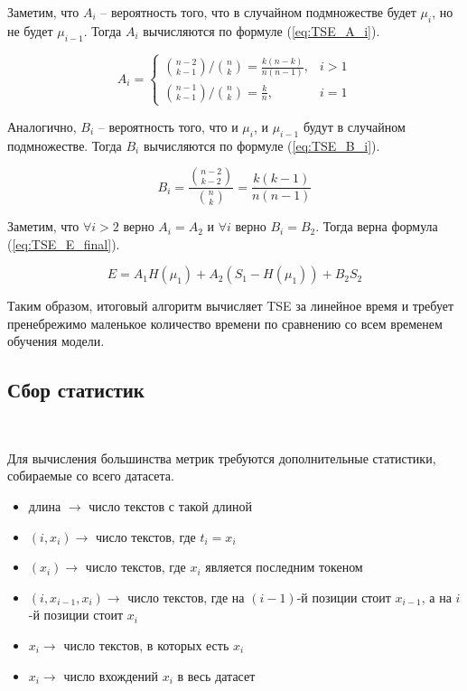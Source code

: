 \documentclass{spbau-diploma}
\begin{document}
Заметим, что $A_i$ -- вероятность того, что в случайном подмножестве будет $\mu_i$, но не будет $\mu_{i-1}$. Тогда $A_i$ вычисляются по формуле (\ref{eq:TSE_A_i}).

\begin{equation} \label{eq:TSE_A_i}
A_i = 
\begin{cases}
\binom{n-2}{k-1}/\binom{n}{k}=\frac{k(n-k)}{n(n-1)},& i > 1 \\
\binom{n-1}{k-1}/\binom{n}{k}=\frac k n,& i = 1
\end{cases}
\end{equation}

Аналогично, $B_i$ -- вероятность того, что и $\mu_i$, и $\mu_{i-1}$ будут в случайном подмножестве. Тогда $B_i$ вычисляются по формуле (\ref{eq:TSE_B_i}).

\begin{equation} \label{eq:TSE_B_i}
B_i = \frac{\binom{n-2}{k-2}}{\binom{n}{k}} = \frac{k(k-1)}{n(n-1)}
\end{equation}

Заметим, что $\forall i > 2$ верно $A_i = A_2$ и $\forall i$ верно $B_i = B_2$. Тогда верна формула (\ref{eq:TSE_E_final}).

\begin{equation} \label{eq:TSE_E_final}
E = A_1H(\mu_1) + A_2(S_1 - H(\mu_1)) + B_2S_2
\end{equation}

Таким образом, итоговый алгоритм вычисляет TSE за линейное время и требует пренебрежимо маленькое количество времени по сравнению со всем временем обучения модели.

\subsection{Сбор статистик}
\ 

Для вычисления большинства метрик требуются дополнительные статистики, собираемые со всего датасета.

\begin{itemize}
	\item длина $\rightarrow$ число текстов с такой длиной
	\item $(i, x_i) \rightarrow$ число текстов, где $t_i = x_i$ 
	\item $(x_i)\rightarrow$ число текстов, где $x_i$ является последним токеном
	\item $(i, x_{i-1}, x_i) \rightarrow$ число текстов, где на $(i-1)$-й позиции стоит $x_{i-1}$, а на $i$-й позиции стоит $x_i$
	\item $x_i \rightarrow$ число текстов, в которых есть $x_i$
	\item $x_i \rightarrow $ число вхождений $x_i$ в весь датасет
\end{itemize}
\end{document}
